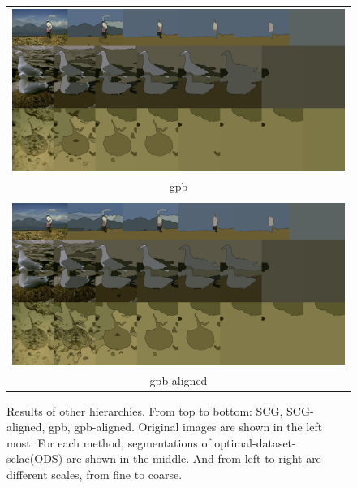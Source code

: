 \begin{figure}[tb]
\begin{center}
\begin{tabular}{c}
\includegraphics[width=17cm]{fig/smfig/stack_gpb.png} \\
gpb\\ \\
\includegraphics[width=17cm]{fig/smfig/stack_gpb_a.png} \\
gpb-aligned
\end{tabular}
\end{center}
\caption{Results of other hierarchies. From top to bottom: SCG, SCG-aligned, gpb, gpb-aligned. Original images are shown in the left most. For each method, segmentations of optimal-dataset-sclae(ODS) are shown in the middle. And from left to right are different scales, from fine to coarse.}
\label{fig:more_hier}
\end{figure}


